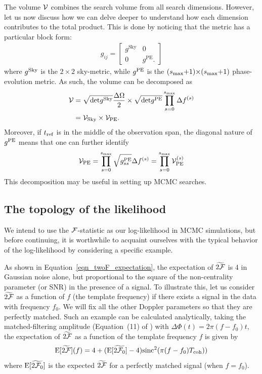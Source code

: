 \documentclass[aps, prd, twocolumn, superscriptaddress, floatfix, showpacs, nofootinbib, longbibliography]{revtex4-1}
\begin{document}
The volume $\mathcal{V}$ combines the search volume from all search dimensions. However,
let us now discuss how we can delve deeper to understand how each dimension
contributes to the total product. This is done by noticing that the metric has
a particular block form:
\begin{align}
g_{ij} = \left[
\begin{array}{cc}
g^{\textrm{Sky}} & 0 \\
0 & g^{\textrm{PE}}.
\end{array}
\right]
\end{align}
where $g^{\rm Sky}$ is the $2\times2$ sky-metric, while $g^{\rm PE}$ is the
$(s_{\textrm{max}}{+}1){\times}(s_{\textrm{max}}{+}1)$ phase-evolution metric.
As such, the volume can be decomposed as
\begin{align}
\mathcal{V} & =
\sqrt{\textrm{det}g^{\rm Sky}}\frac{\Delta\Omega}{2} \times
\sqrt{\textrm{det}g^{\rm PE}}\prod_{s=0}^{s_{\textrm{max}}}\Delta f^{(s)} \\
& = \mathcal{V}_{\rm Sky} \times \mathcal{V}_{\rm PE}.
\label{eqn_metric_volume}
\end{align}
Moreover, if $t_{\rm ref}$ is in the middle of the observation span, the diagonal
nature of $g^{\rm PE}$ means that one can further identify
\begin{align}
\mathcal{V}_{\rm PE} = \prod_{s=0}^{s_{\textrm{max}}}\sqrt{g^{\rm PE}_{ss}} \Delta f^{(s)}
= \prod_{s=0}^{s_{\textrm{max}}}\mathcal{V}_{\rm PE}^{(s)}
\end{align}
This decomposition may be useful in setting up MCMC searches.

\subsection{The topology of the likelihood}
\label{sec_topology}

We intend to use the ${\mathcal{F}}$-statistic as our log-likelihood in MCMC simulations,
but before continuing, it is worthwhile to acquaint ourselves with the typical
behavior of the log-likelihood by considering a specific example.

As shown in Equation~\eqref{eqn_twoF_expectation}, the expectation of
$\widetilde{2{\mathcal{F}}}$ is 4 in Gaussian noise alone, but proportional to the square
of the non-centrality parameter (or SNR) in the presence of a signal. To
illustrate this, let us consider $\widetilde{2{\mathcal{F}}}$ as a function of $f$ (the
template frequency) if there exists a signal in the data with frequency $f_0$.
We will fix all the other Doppler parameters so that they are perfectly
matched.  Such an example can be calculated analytically, taking the
matched-filtering amplitude (Equation~(11) of \citep{prix2005}) with
$\Delta\Phi(t) = 2\pi(f - f_0) t$, the expectation of $\widetilde{2{\mathcal{F}}}$ as a
function of the template frequency $f$ is given by
\begin{equation}
\textrm{E}[\widetilde{2{\mathcal{F}}}](f) = 4 +
(\textrm{E}[\widetilde{2{\mathcal{F}}_0}] -4)\textrm{sinc}^{2}(\pi(f-f_0)T_{\rm coh}))
\label{eqn_grid_prediction}
\end{equation}
where $\textrm{E}[\widetilde{2{\mathcal{F}}_0}]$ is the expected $\widetilde{2{\mathcal{F}}}$ for
a perfectly matched signal (when $f=f_0$).
\end{document}

